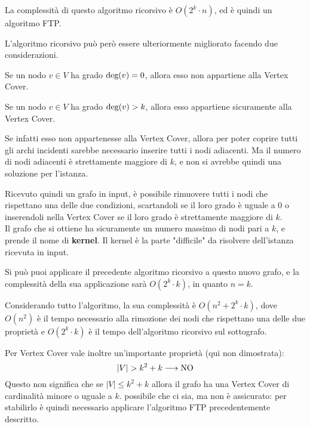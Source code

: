 La complessità di questo algoritmo ricorsivo è $O(2^k \cdot n)$, ed è quindi un algoritmo FTP.

L'algoritmo ricorsivo può però essere ulteriormente migliorato facendo due considerazioni.
\begin{property}
    Se un nodo $v \in V$ ha grado $\textnormal{deg}(v) = 0$, allora esso non appartiene alla Vertex Cover.
\end{property}

\begin{property}
    Se un nodo $v \in V$ ha grado $\textnormal{deg}(v) > k$, allora esso appartiene sicuramente alla Vertex Cover.
\end{property}
Se infatti esso non appartenesse alla Vertex Cover, allora per 
poter coprire tutti gli archi incidenti sarebbe necessario 
inserire tutti i nodi adiacenti. Ma il numero di nodi adiacenti è 
strettamente maggiore di $k$, e non si avrebbe quindi una 
soluzione per l'istanza.

Ricevuto quindi un grafo in input, è possibile rimuovere tutti i nodi che rispettano una delle due condizioni, scartandoli se il loro grado è uguale a $0$ o inserendoli nella Vertex Cover se il loro grado è strettamente maggiore di $k$.\\
Il grafo che si ottiene ha sicuramente un numero massimo di nodi pari a $k$, e prende il nome di \textbf{kernel}.
Il kernel è la parte "difficile" da risolvere dell'istanza ricevuta in input.

Si può puoi applicare il precedente algoritmo ricorsivo a questo nuovo grafo, e la complessità della sua applicazione sarà $O(2^k \cdot k)$, in quanto $n = k$.

Considerando tutto l'algoritmo, la sua complessità è $O(n^2 + 2^k \cdot k)$, dove $O(n^2)$ è il tempo necessario alla rimozione dei nodi che rispettano una delle due proprietà e $O(2^k \cdot k)$ è il tempo dell'algoritmo ricorsivo sul sottografo.

Per Vertex Cover vale inoltre un'importante proprietà (qui non dimostrata):
\[
    |V| > k^2 + k \longrightarrow \textnormal{NO}
\]
Questo non significa che se $|V| \le k^2 + k$ allora il grafo ha una Vertex Cover di cardinalità minore o uguale a $k$. \upperAccE possibile che ci sia, ma non è assicurato: per stabilirlo è quindi necessario applicare l'algoritmo FTP precedentemente descritto.
